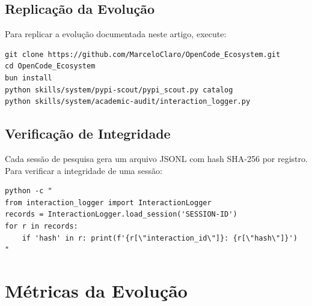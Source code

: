 \documentclass[12pt,a4paper]{article}
\begin{document}
\subsection{Replicação da Evolução}

Para replicar a evolução documentada neste artigo, execute:

\begin{verbatim}
git clone https://github.com/MarceloClaro/OpenCode_Ecosystem.git
cd OpenCode_Ecosystem
bun install
python skills/system/pypi-scout/pypi_scout.py catalog
python skills/system/academic-audit/interaction_logger.py
\end{verbatim}

\subsection{Verificação de Integridade}

Cada sessão de pesquisa gera um arquivo JSONL com hash SHA-256 por registro. Para verificar a integridade de uma sessão:

\begin{verbatim}
python -c "
from interaction_logger import InteractionLogger
records = InteractionLogger.load_session('SESSION-ID')
for r in records:
    if 'hash' in r: print(f'{r[\"interaction_id\"]}: {r[\"hash\"]}')
"
\end{verbatim}

\section{Métricas da Evolução}
\end{document}
